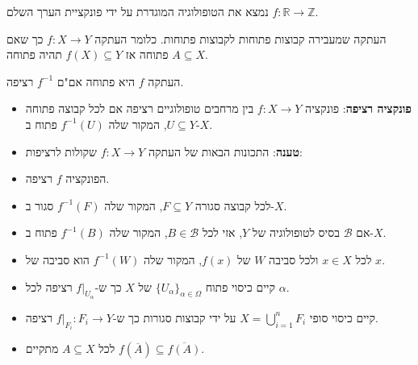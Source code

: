 \documentclass{tstextbook}
\begin{document}
\begin{example}
נמצא את הטופולוגיה המוגדרת על ידי פונקציית הערך השלם \(f:\mathbb{R}\to \mathbb{Z}\).

\end{example}
\begin{definition}
העתקה שמעבירה קבוצות פתוחות לקבוצות פתוחות. כלומר העתקה \(f:X\to Y\) כך שאם \(A\subseteq X\) פתוחה אז \(f(X)\subseteq Y\) תהיה פתוחה.

\end{definition}
\begin{proposition}
העתקה \(f\) היא פתוחה אם"ם \(f^{-1}\) רציפה.

\end{proposition}
\begin{summary}
  \begin{itemize}
    \item \textbf{פונקציה רציפה}: פונקציה \(f:X\to Y\) בין מרחבים טופולוגיים רציפה אם לכל קבוצה פתוחה \(U \subseteq Y\), המקור שלה \(f^{-1}(U)\) פתוח ב-\(X\).
    \item \textbf{טענה}: התכונות הבאות של העתקה \(f:X\to Y\) שקולות לרציפות:


    \item הפונקציה \(f\) רציפה. 


    \item לכל קבוצה סגורה \(F\subseteq Y\), המקור שלה \(f^{-1}(F)\) סגור ב-\(X\). 


    \item אם \(\mathcal{B}\) בסיס לטופולוגיה של \(Y\), אזי לכל \(B \in \mathcal{B}\), המקור שלה \(f^{-1}(B)\) פתוח ב-\(X\). 


    \item לכל \(x \in X\) ולכל סביבה \(W\) של \(f(x)\), המקור שלה \(f^{-1}(W)\) הוא סביבה של \(x\). 


    \item קיים כיסוי פתוח \(\{ U_{\alpha} \}_{\alpha \in \Omega}\) של \(X\) כך ש-\(f|_{U_{\alpha}}\) רציפה לכל \(\alpha\). 


    \item קיים כיסוי סופי \(X=\bigcup_{i=1}^{n}F_{i}\) על ידי קבוצות סגורות כך ש-\(f|_{F_{i}}:F_{i}\to Y\) רציפה. 


    \item לכל \(A\subseteq X\) מתקיים \(f(\overline{A})\subseteq \overline{f(A)}\). 



\end{itemize}
\end{summary}
\end{document}
